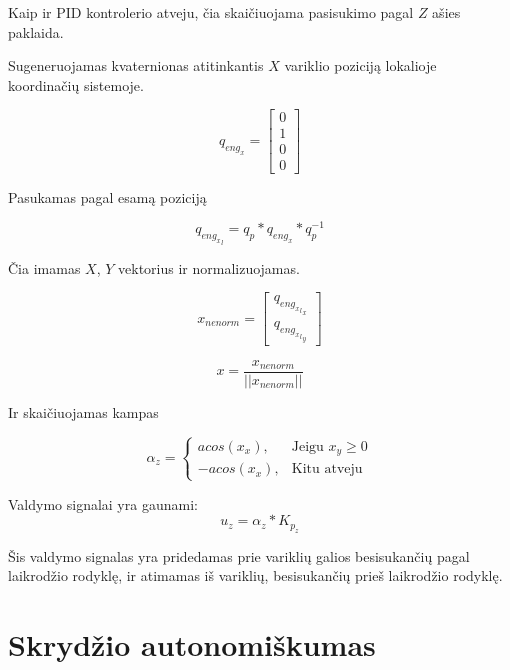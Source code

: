 \documentclass[12pt, a4paper, lithuanian, final]{article}
\begin{document}
Kaip ir PID kontrolerio atveju, čia skaičiuojama pasisukimo pagal $Z$ ašies paklaida.

Sugeneruojamas kvaternionas atitinkantis $X$ variklio poziciją lokalioje koordinačių sistemoje.

\begin{equation}
	q_{eng_x} = \left[
		\begin{array}{c}
			0 \\
			1 \\
			0 \\
			0
		\end{array}
	\right]
\end{equation}

Pasukamas pagal esamą poziciją

\begin{equation}
	q_{{eng_x}_l} = q_p * q_{eng_x} * q_p^{-1}
\end{equation}

Čia imamas $X$, $Y$ vektorius ir normalizuojamas.

\begin{equation}
	x_{nenorm} = \left[
		\begin{array}{c}
			q_{{{eng_x}_l}_x} \\
			q_{{{eng_x}_l}_y}
		\end{array}
	\right]
\end{equation}

\begin{equation}
	x = \dfrac{x_{nenorm}}{||x_{nenorm}||}
\end{equation}

Ir skaičiuojamas kampas

\begin{equation}
	\alpha_z = \begin{cases}
		acos(x_x), & \text{Jeigu } x_y \geq 0\\
		-acos(x_x), & \text{Kitu atveju}
	\end{cases}
\end{equation}

Valdymo signalai yra gaunami: 
\begin{equation}
	u_z = \alpha_z * K_{p_z}
\end{equation}

Šis valdymo signalas yra pridedamas prie variklių galios besisukančių pagal laikrodžio rodyklę, ir atimamas iš variklių, besisukančių prieš laikrodžio rodyklę.




\section{Skrydžio autonomiškumas}
\label{skyr-autonomus}
\end{document}
